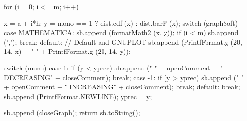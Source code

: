 \begin{code}
\begin{hide}
{      for (i = 0; i <= m; i++) {
         x = a + i*h;
         y = mono == 1 ? dist.cdf (x) : dist.barF (x);
         switch (graphSoft) {
         case MATHEMATICA:
            sb.append (formatMath2 (x, y));
            if (i < m)
               sb.append (',');
            break;
         default: // Default and GNUPLOT
            sb.append (PrintfFormat.g (20, 14, x) +  "      " +
                       PrintfFormat.g (20, 14, y));
         }

         switch (mono) {
         case 1:
            if (y < yprec)
               sb.append ("    " + openComment +
                    "  DECREASING" + closeComment);
            break;
         case -1:
            if (y > yprec)
               sb.append ("    " + openComment +
                    "  INCREASING" + closeComment);
            break;
         default:
            break;
         }
         sb.append (PrintfFormat.NEWLINE);
         yprec = y;
      }
      sb.append (closeGraph);
      return sb.toString();
   }\end{hide}
\end{code}
